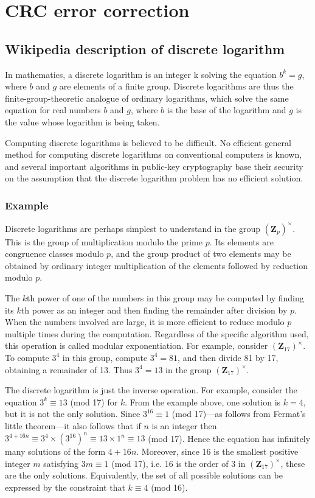 \documentclass[a4paper, 11pt]{article}
\begin{document}
\section{CRC error correction}
\label{sec:crc}

\subsection{Wikipedia description of discrete logarithm}
In mathematics, a discrete logarithm is an integer k solving the equation $b^k = g$, where $b$ and $g$ are elements of a finite group. Discrete logarithms are thus the finite-group-theoretic analogue of ordinary logarithms, which solve the same equation for real numbers $b$ and $g$, where $b$ is the base of the logarithm and $g$ is the value whose logarithm is being taken.

Computing discrete logarithms is believed to be difficult. No efficient general method for computing discrete logarithms on conventional computers is known, and several important algorithms in public-key cryptography base their security on the assumption that the discrete logarithm problem has no efficient solution.

\subsubsection{Example}
Discrete logarithms are perhaps simplest to understand in the group $(\mathbf{Z}_p)^\times$. This is the group of multiplication modulo the prime $p$. Its elements are congruence classes modulo $p$, and the group product of two elements may be obtained by ordinary integer multiplication of the elements followed by reduction modulo $p$.

The $k$th power of one of the numbers in this group may be computed by finding its $k$th power as an integer and then finding the remainder after division by $p$. When the numbers involved are large, it is more efficient to reduce modulo $p$ multiple times during the computation. Regardless of the specific algorithm used, this operation is called modular exponentiation. For example, consider $(\mathbf{Z}_{17})^\times$. To compute $3^4$ in this group, compute $3^4 = 81$, and then divide 81 by 17, obtaining a remainder of 13. Thus $3^4 = 13$ in the group $(\mathbf{Z}_{17})^\times$.

The discrete logarithm is just the inverse operation. For example, consider the equation $3^k \equiv 13$ (mod 17) for $k$. From the example above, one solution is $k = 4$, but it is not the only solution. Since $3^{16} \equiv 1$ (mod 17)---as follows from Fermat's little theorem---it also follows that if $n$ is an integer then $3^{4+16n} \equiv 3^4 \times (3^{16})^n \equiv 13 \times 1^n \equiv 13 $ (mod 17). Hence the equation has infinitely many solutions of the form $4 + 16n$. Moreover, since 16 is the smallest positive integer $m$ satisfying $3m \equiv 1$ (mod 17), i.e. 16 is the order of 3 in $(\mathbf{Z}_{17})^\times$, these are the only solutions. Equivalently, the set of all possible solutions can be expressed by the constraint that $k \equiv 4 $  (mod 16).
\end{document}
